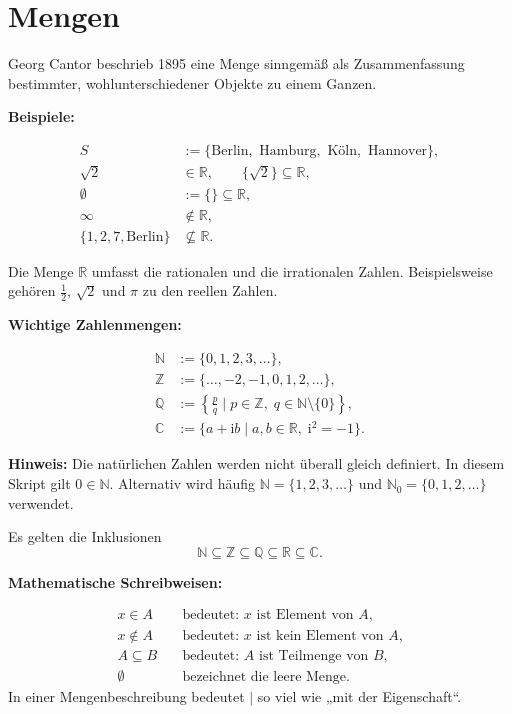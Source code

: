\section{Mengen }

Georg Cantor beschrieb 1895 eine Menge sinngemäß als Zusammenfassung
bestimmter, wohlunterschiedener Objekte zu einem Ganzen.

\textbf{Beispiele:}

\begin{align*}
 S &:= \{\text{Berlin},\text{ Hamburg},\text{ Köln},\text{ Hannover}\},\\
 \sqrt{2} &\in \mathbb{R},\qquad \{\sqrt{2}\}\subseteq\mathbb{R},\\
 \emptyset &:= \{\}\subseteq\mathbb{R},\\
 \infty &\notin\mathbb{R},\\
 \{1,2,7,\text{Berlin}\} &\nsubseteq\mathbb{R}.
\end{align*}

Die Menge $\mathbb{R}$ umfasst die rationalen und die irrationalen
Zahlen. Beispielsweise gehören $\frac{1}{2}$, $\sqrt{2}$ und $\pi$
zu den reellen Zahlen.

\textbf{Wichtige Zahlenmengen:}

\begin{align*}
 \mathbb{N} &:= \{0,1,2,3,\ldots\},\\
 \mathbb{Z} &:= \{\ldots,-2,-1,0,1,2,\ldots\},\\
 \mathbb{Q} &:= \left\{\frac{p}{q}\mid p\in\mathbb{Z},\;
                       q\in\mathbb{N}\setminus\{0\}\right\},\\
 \mathbb{C} &:= \{a+\mathrm{i}b\mid a,b\in\mathbb{R},\;\mathrm{i}^2=-1\}.
\end{align*}

\textbf{Hinweis:} Die natürlichen Zahlen werden nicht überall gleich
definiert. In diesem Skript gilt $0\in\mathbb{N}$. Alternativ wird
häufig $\mathbb{N}=\{1,2,3,\ldots\}$ und
$\mathbb{N}_0=\{0,1,2,\ldots\}$ verwendet.

Es gelten die Inklusionen
\[
 \mathbb{N}\subseteq\mathbb{Z}\subseteq\mathbb{Q}
 \subseteq\mathbb{R}\subseteq\mathbb{C}.
\]

\textbf{Mathematische Schreibweisen:}

\begin{align*}
 x\in A &\quad\text{bedeutet: $x$ ist Element von $A$,}\\
 x\notin A &\quad\text{bedeutet: $x$ ist kein Element von $A$,}\\
 A\subseteq B &\quad\text{bedeutet: $A$ ist Teilmenge von $B$,}\\
 \emptyset &\quad\text{bezeichnet die leere Menge.}
\end{align*}
In einer Mengenbeschreibung bedeutet $\mid$ so viel wie
„mit der Eigenschaft“.

